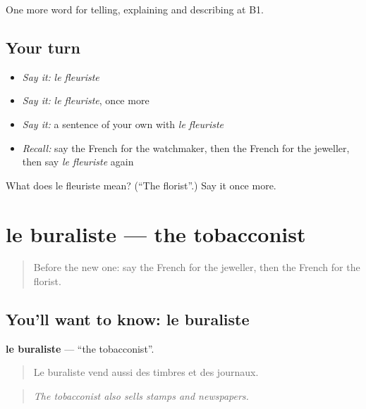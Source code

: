 \begin{grammarlens}[title={What you've built}]
One more word for telling, explaining and describing at B1.
\end{grammarlens}

\subsection*{Your turn}
\begin{itemize}
\raggedright
  \item \emph{Say it:} \emph{le fleuriste}
  \item \emph{Say it:} \emph{le fleuriste}, once more
  \item \emph{Say it:} a sentence of your own with \emph{le fleuriste}
  \item \emph{Recall:} say the French for the watchmaker, then the French for the jeweller, then say \emph{le fleuriste} again
\end{itemize}

\begin{tcolorbox}[breakable,colback=teal!4,colframe=teal!35!black,title={Before you move on}]
What does le fleuriste mean? (\textquotedblleft{}The florist\textquotedblright{}.) Say it once more.
\end{tcolorbox}
\section[le buraliste]{le buraliste — the tobacconist}

\label{lesson:FR-C449-buraliste}



\begin{quote}
Before the new one: say the French for the jeweller, then the French for the florist.
\end{quote}

\subsection*{You'll want to know: le buraliste}
\textbf{le buraliste} — \textquotedblleft{}the tobacconist\textquotedblright{}.

\begin{quote}
Le buraliste vend aussi des timbres et des journaux.
\end{quote}

\begin{quote}
\emph{The tobacconist also sells stamps and newspapers.}
\end{quote}

